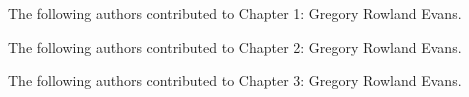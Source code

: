 \noindent The following authors contributed to Chapter 1: Gregory Rowland Evans.

\noindent The following authors contributed to Chapter 2: Gregory Rowland Evans.

\noindent The following authors contributed to Chapter 3: Gregory Rowland Evans. 

